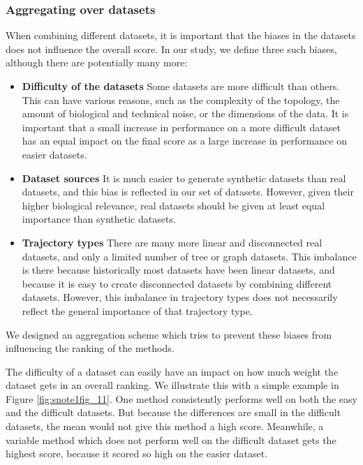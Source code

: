 \subsubsection{Aggregating over datasets}

When combining different datasets, it is important that the biases in the datasets does not influence the overall score. In our study, we define three such biases, although there are potentially many more:

\begin{itemize}
	\item \textbf{Difficulty of the datasets} Some datasets are more difficult than others. This can have various reasons, such as the complexity of the topology, the amount of biological and technical noise, or the dimensions of the data. It is important that a small increase in performance on a more difficult dataset has an equal impact on the final score as a large increase in performance on easier datasets.
	\item \textbf{Dataset sources} It is much easier to generate synthetic datasets than real datasets, and this bias is reflected in our set of datasets. However, given their higher biological relevance, real datasets should be given at least equal importance than synthetic datasets.
	\item \textbf{Trajectory types} There are many more linear and disconnected real datasets, and only a limited number of tree or graph datasets. This imbalance is there because historically most datasets have been linear datasets, and because it is easy to create disconnected datasets by combining different datasets. However, this imbalance in trajectory types does not necessarily reflect the general importance of that trajectory type.
\end{itemize}

We designed an aggregation scheme which tries to prevent these biases from influencing the ranking of the methods.

The difficulty of a dataset can easily have an impact on how much weight the dataset gets in an overall ranking. We illustrate this with a simple example in Figure \ref{fig:snote1fig_11}. One method consistently performs well on both the easy and the difficult datasets. But because the differences are small in the difficult datasets, the mean would not give this method a high score. Meanwhile, a variable method which does not perform well on the difficult dataset gets the highest score, because it scored so high on the easier dataset.

